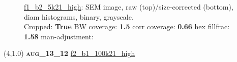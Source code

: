 \begin{figure}[h!]
\label{semimg18}
\caption*{\hyperlink{covtableaug_13_12}{\color{blue} \small \ttfamily f1\_b2\_5k21\_high}: SEM image, raw (top)/size-corrected (bottom), diam histograms, binary, grayscale.\\Cropped: {\bf True} \;\; BW coverage: {\bf 1.5} \:\: corr coverage: {\bf 0.66} \:\: hex fillfrac: {\bf 1.58} \:\: man-adjustment: {\bf \color{blue}{Yes}}}
\end{figure}
\newpage

\begin{textblock}{5}(4,1.0)
{\bf \textsc{aug\_13\_12}}
\hspace{4.5cm}
\hyperlink{covtableaug_13_12}{\color{blue} \large \ttfamily f2\_b1\_100k21\_high}
\end{textblock}

